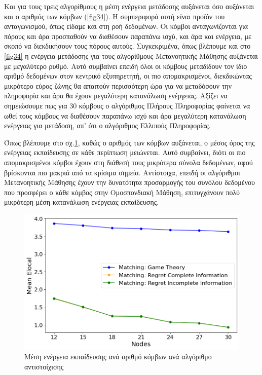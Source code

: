 Και για τους τρεις αλγορίθμους η μέση ενέργεια μετάδοσης αυξάνεται όσο αυξάνεται και ο αριθμός των κόμβων (\ref{fig34}). Η συμπεριφορά αυτή είναι προϊόν του ανταγωνισμού, όπως είδαμε και στη ροή δεδομένων. Οι κόμβοι ανταγωνίζονται για πόρους και άρα προσπαθούν να διαθέσουν παραπάνω ισχύ, και άρα και ενέργεια, με σκοπό να διεκδικήσουν τους πόρους αυτούς. Συγκεκριμένα, όπως βλέπουμε και στο \ref{fig34} η ενέργεια μετάδοσης για τους αλγορίθμους Μετανοητικής Μάθησης αυξάνεται με μεγαλύτερο ρυθμό. Αυτό συμβαίνει επειδή όλοι οι κόμβους μεταδίδουν τον ίδιο αριθμό δεδομένων στον κεντρικό εξυπηρετητή, οι πιο απομακρισμένοι, διεκδικώντας μικρότερο εύρος ζώνης θα απαιτούν περισσότερη ώρα για να μεταδόσουν την πληροφορία και άρα θα έχουν μεγαλύτερη κατανάλωση ενέργειας. Αξίζει να σημειώσουμε πως για 30 κόμβους ο αλγόριθμος Πλήρους Πληροφορίας φαίνεται να ωθεί τους κόμβους να διαθέσουν παραπάνω ισχύ και άρα μεγαλύτερη κατανάλωση ενέργειας για μετάδοση, απ' ότι ο αλγόριθμος Ελλιπούς Πληροφορίας.

Όπως βλέπουμε στο σχ.\ref{fig35}, καθώς ο αριθμός των κόμβων αυξάνεται, ο μέσος όρος της ενέργειας εκπαίδευσης σε κάθε περίπτωση μειώνεται. Αυτό συμβαίνει, διότι οι πιο απομακρισμένοι κόμβοι έχουν στη διάθεσή τους μικρότερα σύνολα δεδομένων, αφού βρίσκονται πιο μακριά από τα κρίσιμα σημεία. Αντίστοιχα, επειδή οι αλγόριθμοι Μετανοητικής Μάθησης έχουν την δυνατότητα προσαρμογής του συνόλου δεδομένου που προσφέρει ο κάθε κόμβος στην Ομοσπονδιακή Μάθηση, επιτυγχάνουν πολύ μικρότερη μέση κατανάλωση ενέργειας εκπαίδευσης. 

\newpage

\begin{figure}[H]
    \centering
    \includegraphics[width=\textwidth]{figures/chapter4/Mean_Elocal_vs_Users.png}
    \caption{Μέση ενέργεια εκπαίδευσης ανά αριθμό κόμβων ανά αλγόριθμο αντιστοίχισης}
    \label{fig35}
\end{figure}

